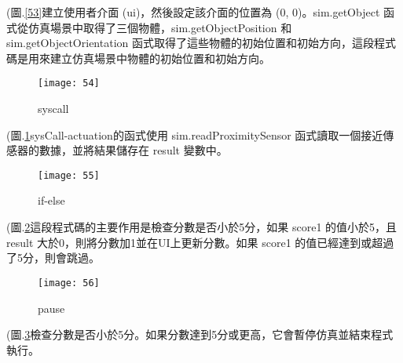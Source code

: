 \newpage
(圖.\ref{53}建立使用者介面 (ui)，然後設定該介面的位置為 (0, 0)。sim.getObject 函式從仿真場景中取得了三個物體，sim.getObjectPosition 和 sim.getObjectOrientation 函式取得了這些物體的初始位置和初始方向，這段程式碼是用來建立仿真場景中物體的初始位置和初始方向。\\
\begin{figure}[hbt!]
\begin{center}
\texttt{[image: 54]}
\caption{\Large syscall}\label{54}
\end{center}
\end{figure}

(圖.\ref{54}sysCall-actuation的函式使用 sim.readProximitySensor 函式讀取一個接近傳感器的數據，並將結果儲存在 result 變數中。\\
\newpage
\begin{figure}[hbt!]
\begin{center}
\texttt{[image: 55]}
\caption{\Large if-else}\label{55}
\end{center}
\end{figure}

(圖.\ref{55}這段程式碼的主要作用是檢查分數是否小於5分，如果 score1 的值小於5，且 result 大於0，則將分數加1並在UI上更新分數。如果 score1 的值已經達到或超過了5分，則會跳過。\\
\begin{figure}[hbt!]
\begin{center}
\texttt{[image: 56]}
\caption{\Large pause}\label{56}
\end{center}
\end{figure}

(圖.\ref{56}檢查分數是否小於5分。如果分數達到5分或更高，它會暫停仿真並結束程式執行。\\
